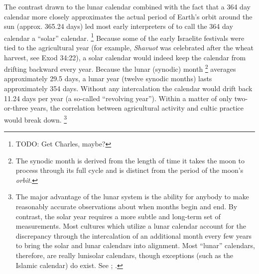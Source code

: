 
\noindent
The contrast drawn to the lunar calendar combined with the fact that a 364 day calendar more closely approximates the actual period of Earth's orbit around the sun (approx. 365.24 days) led most early interpreters of \jub to call the 364 day calendar a ``solar'' calendar.%
    \footnote{TODO: Get Charles, maybe?}
Because some of the early Israelite festivals were tied to the agricultural year (for example, \emph{Shavuot} was celebrated after the wheat harvest, see Exod 34:22), a solar calendar would indeed keep the calendar from drifting backward every year. Because the lunar (synodic) month%
    \footnote{The synodic month is derived from the length of time it takes the moon to process through its full cycle and is distinct from the period of the moon's \emph{orbit}.}
averages approximately 29.5 days, a lunar year (twelve synodic months) lasts approximately 354 days. Without any intercalation the calendar would drift back 11.24 days per year (a so-called ``revolving year''). Within a matter of only two-or-three years, the correlation between agricultural activity and cultic practice would break down.%
    \footnote{The major advantage of the lunar system is the ability for anybody to make reasonably accurate observations about when months begin and end. By contrast, the solar year requires a more subtle and long-term set of measurements. Most cultures which utilize a lunar calendar account for the discrepancy through the intercalation of an additional month every few years to bring the solar and lunar calendars into alignment. Most ``lunar'' calendars, therefore, are really lunisolar calendars, though exceptions (such as the Islamic calendar) do exist. See \cite[214, 238]{glessmer_flint-vanderkam1999}; \cite[37--38]{horowitz_janes1996}.}

